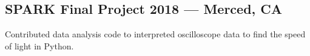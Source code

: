\documentclass[../Resume.tex]{subfiles}
\begin{document}
	\subsection{SPARK Final Project \null\hfill 2018 --- Merced, CA}
	\par Contributed data analysis code to interpreted oscilloscope data to find the speed of light in Python.
	\vspace*{-2mm}
\end{document}
